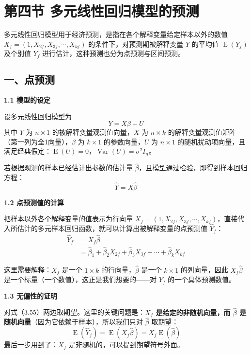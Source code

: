 \documentclass[12pt,a4paper]{ctexart}
\DeclareMathOperator{\Var}{Var}
\DeclareMathOperator{\E}{E}
\begin{document}
\setcounter{secnumdepth}{0}

\section{第四节 多元线性回归模型的预测}

多元线性回归模型用于经济预测，是指在各个解释变量给定样本以外的数值 $X_f = (1, X_{2f}, X_{3f}, \cdots, X_{kf})$ 的条件下，对预测期被解释变量 $Y$ 的平均值 $\E(Y_f)$ 及个别值 $Y_f$ 进行估计，这种预测也分为点预测与区间预测。

\subsection{一、点预测}

\textbf{1.1 模型的设定}

设多元线性回归模型为
\begin{equation}
Y = X\beta + U \tag{A}
\end{equation}
其中 $Y$ 为 $n \times 1$ 的被解释变量观测值向量，$X$ 为 $n \times k$ 的解释变量观测值矩阵（第一列为全1向量），$\beta$ 为 $k \times 1$ 的参数向量，$U$ 为 $n \times 1$ 的随机扰动项向量，且满足经典假定：$\E(U)=0$，$\Var(U)=\sigma^2 I_n$。

若根据观测的样本已经估计出参数的估计量 $\hat{\beta}$，且模型通过检验，即得到样本回归方程：
\[
\hat{Y} = X\hat{\beta}
\]

\textbf{1.2 点预测值的计算}

把样本以外各个解释变量的值表示为行向量 $X_f = (1, X_{2f}, X_{3f}, \cdots, X_{kf})$，直接代入所估计的多元样本回归函数，就可以计算出被解释变量的点预测值 $\hat{Y}_f$：
\begin{align}
\hat{Y}_f &= X_f \hat{\beta} \nonumber \\
&= \hat{\beta}_1 + \hat{\beta}_2 X_{2f} + \hat{\beta}_3 X_{3f} + \cdots + \hat{\beta}_k X_{kf} \tag{3.55}
\end{align}

这里需要解释：$X_f$ 是一个 $1 \times k$ 的行向量，$\hat{\beta}$ 是一个 $k \times 1$ 的列向量，因此 $X_f\hat{\beta}$ 是一个标量（一个数值），这正是我们想要的——对 $Y_f$ 的一个具体预测数值。

\textbf{1.3 无偏性的证明}

对式（3.55）两边取期望。这里的关键问题是：\textbf{$X_f$ 是给定的非随机向量，而 $\hat{\beta}$ 是随机向量}（因为它依赖于样本），所以我们只对 $\hat{\beta}$ 取期望：
\begin{equation}
\E(\hat{Y}_f) = \E(X_f \hat{\beta}) = X_f \E(\hat{\beta}) \tag{*}
\end{equation}
最后一步用到了：$X_f$ 是非随机的，可以提到期望符号外面。
\end{document}
